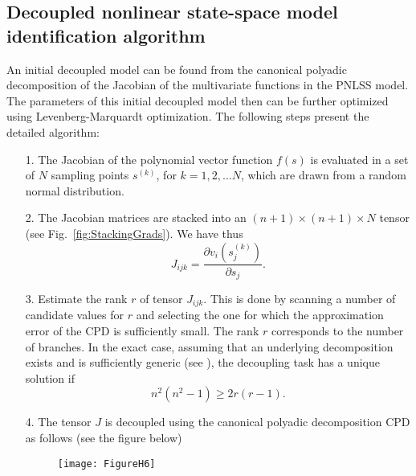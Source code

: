 \documentclass[review]{elsarticle}
\begin{document}
\subsection{Decoupled nonlinear state-space model identification algorithm}
\label{sec:DecouplingAlgorithm}
An initial decoupled model can be found from the canonical polyadic decomposition of the Jacobian of the multivariate functions in the PNLSS model. 
The parameters of this initial decoupled model then can be further optimized using Levenberg-Marquardt optimization. The following steps present the detailed algorithm:
\begin{itemize}
\item[1.] The Jacobian of the polynomial vector function $f(s)$ is evaluated in a set of $N$ sampling points $s^{(k)}$, for $k = 1,2, \ldots N$, which are drawn from a random normal distribution. 
\item[2.] The Jacobian matrices are stacked into an $(n+1) \times (n+1) \times N$ tensor (see Fig.~\ref{fig:StackingGrads}). 
We have thus 
\begin{equation}
J_{ijk}=\frac{\partial v_i (s_j^{(k)})}{\partial s_j}.
\end{equation}
\item[3.] Estimate the rank $r$ of tensor $J_{ijk}$. 
This is done by scanning a number of candidate values for $r$ and selecting the one for which the approximation error of the CPD is sufficiently small. 
The rank $r$ corresponds to the number of branches. 
In the exact case, assuming that an underlying decomposition exists and is sufficiently generic (see \cite{Philippe111}), the decoupling task has a unique solution if 
\begin{equation}
n^2(n^2-1) \geq 2r(r-1).
\end{equation}
\item[4.] The tensor $J$ is decoupled using the canonical polyadic decomposition CPD as follows (see the figure below) \\
\begin{figure}[ht]
\begin{center}
\texttt{[image: FigureH6]}    %

\end{center}
\end{figure}
\end{itemize}
\end{document}
